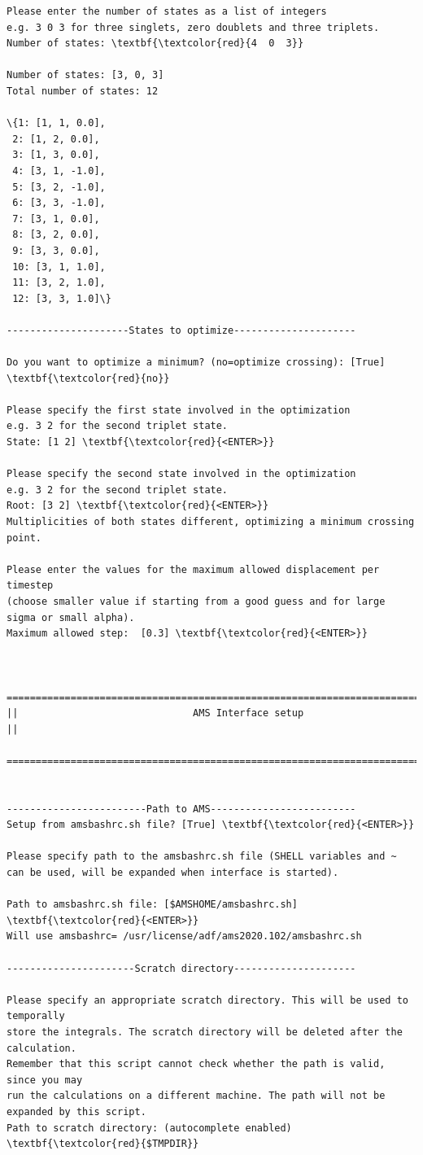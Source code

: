 \documentclass[a4paper,11pt,DIV=15,openany]{scrbook}
\begin{document}
\begin{oframed}
\begin{Verbatim}[commandchars=\\\{\}]
Please enter the number of states as a list of integers
e.g. 3 0 3 for three singlets, zero doublets and three triplets.
Number of states: \textbf{\textcolor{red}{4  0  3}}

Number of states: [3, 0, 3]
Total number of states: 12

\{1: [1, 1, 0.0],
 2: [1, 2, 0.0],
 3: [1, 3, 0.0],
 4: [3, 1, -1.0],
 5: [3, 2, -1.0],
 6: [3, 3, -1.0],
 7: [3, 1, 0.0],
 8: [3, 2, 0.0],
 9: [3, 3, 0.0],
 10: [3, 1, 1.0],
 11: [3, 2, 1.0],
 12: [3, 3, 1.0]\}

---------------------States to optimize---------------------

Do you want to optimize a minimum? (no=optimize crossing): [True] \textbf{\textcolor{red}{no}}

Please specify the first state involved in the optimization
e.g. 3 2 for the second triplet state.
State: [1 2] \textbf{\textcolor{red}{<ENTER>}}

Please specify the second state involved in the optimization
e.g. 3 2 for the second triplet state.
Root: [3 2] \textbf{\textcolor{red}{<ENTER>}}
Multiplicities of both states different, optimizing a minimum crossing point.

Please enter the values for the maximum allowed displacement per timestep 
(choose smaller value if starting from a good guess and for large sigma or small alpha).
Maximum allowed step:  [0.3] \textbf{\textcolor{red}{<ENTER>}} 


  ================================================================================
||                              AMS Interface setup                               ||
  ================================================================================


------------------------Path to AMS-------------------------
Setup from amsbashrc.sh file? [True] \textbf{\textcolor{red}{<ENTER>}}

Please specify path to the amsbashrc.sh file (SHELL variables and ~ can be used, will be expanded when interface is started).

Path to amsbashrc.sh file: [$AMSHOME/amsbashrc.sh] \textbf{\textcolor{red}{<ENTER>}}
Will use amsbashrc= /usr/license/adf/ams2020.102/amsbashrc.sh

----------------------Scratch directory---------------------

Please specify an appropriate scratch directory. This will be used to temporally 
store the integrals. The scratch directory will be deleted after the calculation. 
Remember that this script cannot check whether the path is valid, since you may 
run the calculations on a different machine. The path will not be expanded by this script.
Path to scratch directory: (autocomplete enabled) \textbf{\textcolor{red}{$TMPDIR}}


\end{Verbatim}
\end{oframed}
\end{document}
